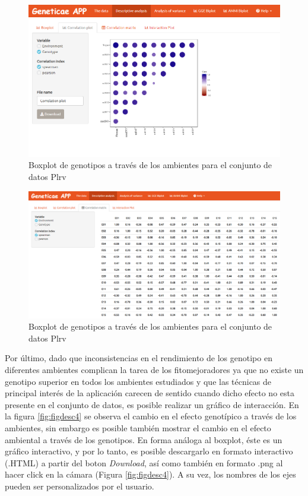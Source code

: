 \begin{figure}[H]
	\begin{center}
		\includegraphics[width=16cm]{./Graficos/corr_gen.png}
	\end{center}
	\caption{Boxplot de genotipos a través de los ambientes para el conjunto de datos Plrv}
	\label{fig:figdesc2}
\end{figure}


\begin{figure}[H]
	\begin{center}
		\includegraphics[width=16cm]{./Graficos/corr_matrix.png}
	\end{center}
	\caption{Boxplot de genotipos a través de los ambientes para el conjunto de datos Plrv}
	\label{fig:figdesc3}
\end{figure}



Por último, dado que inconsistencias en el rendimiento de los genotipo en diferentes ambientes complican la tarea de los fitomejoradores ya que no existe un genotipo superior en todos los ambientes estudiados y que las técnicas de principal interés de la aplicación carecen de sentido cuando dicho efecto no esta presente en el conjunto de datos, es posible realizar un gráfico de interacción. En la figura \ref{fig:figdesc4} se observa el cambio en el efecto genotípico a través de los ambientes, sin embargo es posible también mostrar el cambio en el efecto ambiental a través de los genotipos.
En forma análoga al boxplot, éste es un gráfico interactivo, y por lo tanto, es posible descargarlo en formato interactivo (.HTML) a partir del boton \emph{Download}, así como también en formato .png al hacer click en la cámara (Figura \ref{fig:figdesc4}). A su vez, los nombres de los ejes pueden ser personalizados por el usuario. 



